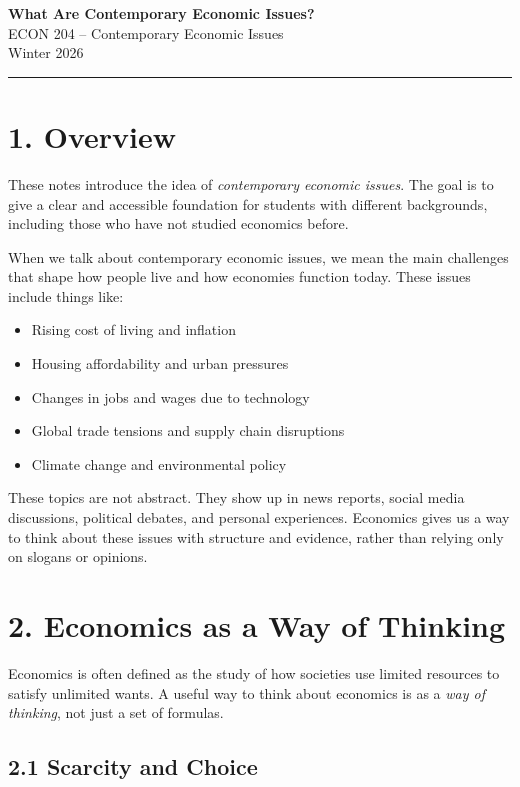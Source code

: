\documentclass[12pt]{article}
\begin{document}
    {\LARGE \textbf{What Are Contemporary Economic Issues?}}\\[0.5em]
    {\large ECON 204 -- Contemporary Economic Issues}\\[0.5em]
 Winter 2026\\


\hrule
\vspace{1em}

\section*{1. Overview}

These notes introduce the idea of \emph{contemporary economic issues}. The goal is to give a clear and accessible foundation for students with different backgrounds, including those who have not studied economics before.

When we talk about contemporary economic issues, we mean the main challenges that shape how people live and how economies function today. These issues include things like:

\begin{itemize}[noitemsep]
    \item Rising cost of living and inflation
    \item Housing affordability and urban pressures
    \item Changes in jobs and wages due to technology
    \item Global trade tensions and supply chain disruptions
    \item Climate change and environmental policy
\end{itemize}

These topics are not abstract. They show up in news reports, social media discussions, political debates, and personal experiences. Economics gives us a way to think about these issues with structure and evidence, rather than relying only on slogans or opinions.


\newpage
\section*{2. Economics as a Way of Thinking}

Economics is often defined as the study of how societies use limited resources to satisfy unlimited wants. A useful way to think about economics is as a \emph{way of thinking}, not just a set of formulas.

\subsection*{2.1 Scarcity and Choice}
\end{document}
